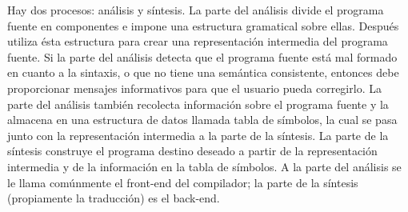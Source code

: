 Hay dos procesos: análisis y síntesis. La parte del análisis divide el programa fuente en componentes e impone una estructura gramatical sobre ellas. Después utiliza ésta estructura para crear una representación intermedia del programa fuente. Si la parte del análisis detecta que el programa fuente está mal formado en cuanto a la sintaxis, o que no tiene una semántica consistente, entonces debe proporcionar mensajes informativos para que el usuario pueda corregirlo. La parte del análisis también recolecta información sobre el programa fuente y la almacena en una estructura de datos llamada tabla de símbolos, la cual se pasa junto con la representación intermedia a la parte de la síntesis. La parte de la síntesis construye el programa destino deseado a partir de la representación intermedia y de la información en la tabla de símbolos. A la parte del análisis se le llama comúnmente el front-end del compilador; la parte de la síntesis (propiamente la traducción) es el back-end.




